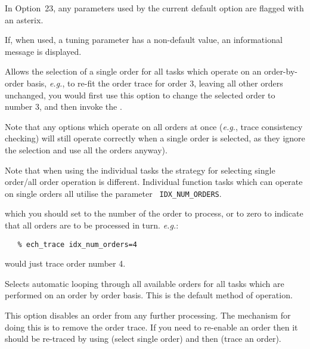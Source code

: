 In Option~23, any parameters used by the current default option are flagged
with an asterix.

If, when used, a tuning parameter has a non-default value, an informational
message is displayed.



Allows the selection of a single order for all tasks which operate on an
order-by-order basis, {\it{e.g.}}, to re-fit the order trace for order 3,
leaving all other orders unchanged, you would first use this option to
change the selected order to number 3, and then invoke the
.

Note that any options which operate on all orders at once ({\it{e.g.}},
trace consistency checking) will still operate correctly when a single
order is selected, as they ignore the selection and use all the orders
anyway).

Note that when using the individual tasks the strategy for selecting single
order/all order operation is different. Individual function tasks which can
operate on single orders all utilise the parameter {\tt
IDX\_NUM\_ORDERS}\@.

which you should set to the number of the order to process, or to zero to
indicate that all orders are to be processed in turn. {\it{e.g.}}:

\begin{verbatim}
   % ech_trace idx_num_orders=4
\end{verbatim}

would just trace order number 4.


Selects automatic looping through all available orders for all tasks which
are performed on an order by order basis.  This is the default method of
operation.



This option disables an order from any further processing. The mechanism
for doing this is to remove the order trace. If you need to re-enable an
order then it should be re-traced by using 
(select single order) and then 
(trace an order).

